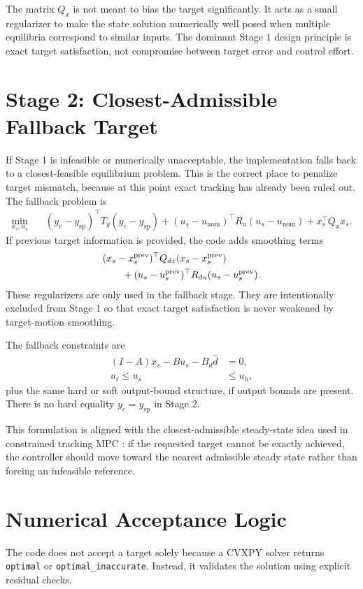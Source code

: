 \documentclass[11pt]{article}
\newcommand{\xs}{x_s}
\newcommand{\us}{u_s}
\newcommand{\ysp}{y_{\mathrm{sp}}}
\newcommand{\yctrl}{y_c}
\newcommand{\dhat}{\hat d}
\begin{document}
The matrix $Q_x$ is not meant to bias the target significantly. It acts as a
small regularizer to make the state solution numerically well posed when
multiple equilibria correspond to similar inputs. The dominant Stage 1 design
principle is exact target satisfaction, not compromise between target error and
control effort.

\section{Stage 2: Closest-Admissible Fallback Target}
If Stage 1 is infeasible or numerically unacceptable, the implementation falls
back to a closest-feasible equilibrium problem. This is the correct place to
penalize target mismatch, because at this point exact tracking has already been
ruled out. The fallback problem is
\begin{align}
    \min_{\xs,\us} \quad
    & (\yctrl-\ysp)^\top T_y (\yctrl-\ysp)
    + (\us-u_{\mathrm{nom}})^\top R_u (\us-u_{\mathrm{nom}})
    + \xs^\top Q_x \xs.
    \label{eq:stage2_cost}
\end{align}
If previous target information is provided, the code adds smoothing terms
\begin{align}
    &(\xs-\xs^{\mathrm{prev}})^\top Q_{dx} (\xs-\xs^{\mathrm{prev}}) \notag\\
    &\qquad + (\us-\us^{\mathrm{prev}})^\top R_{du} (\us-\us^{\mathrm{prev}}).
    \label{eq:stage2_smoothing}
\end{align}
These regularizers are only used in the fallback stage. They are intentionally
excluded from Stage 1 so that exact target satisfaction is never weakened by
target-motion smoothing.

The fallback constraints are
\begin{align}
    (I-A)\xs - B\us - B_d \dhat &= 0, \\
    u_{\ell} \le \us &\le u_h,
\end{align}
plus the same hard or soft output-bound structure, if output bounds are present.
There is no hard equality $\yctrl = \ysp$ in Stage 2.

This formulation is aligned with the closest-admissible steady-state idea used
in constrained tracking MPC \cite{Limon2008}: if the requested target cannot be
exactly achieved, the controller should move toward the nearest admissible
steady state rather than forcing an infeasible reference.

\section{Numerical Acceptance Logic}
The code does not accept a target solely because a CVXPY solver returns
\texttt{optimal} or \texttt{optimal\_inaccurate}. Instead, it validates the
solution using explicit residual checks.
\end{document}
